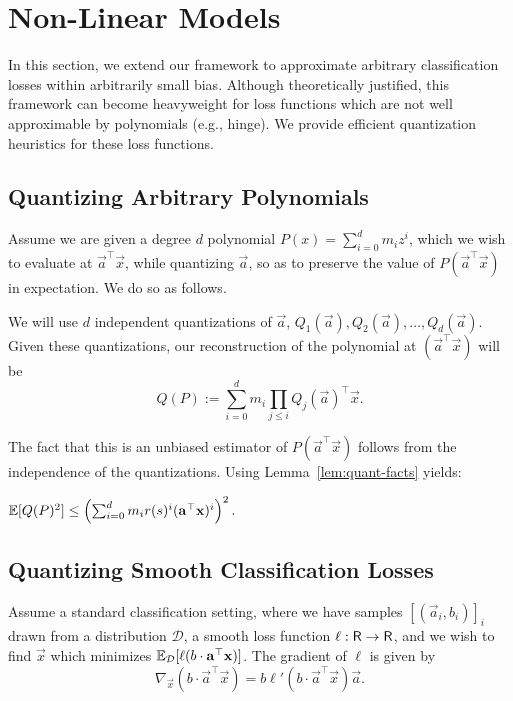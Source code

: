 \vspace{-0.5em}
\section{Non-Linear Models}

In this section, we extend our framework to approximate arbitrary classification losses within arbitrarily small bias. 
Although theoretically justified, this framework can become heavyweight for loss functions which are not well approximable by polynomials 
(e.g., hinge). We provide efficient quantization heuristics for these loss functions. 

\subsection{Quantizing Arbitrary Polynomials} 

Assume we are given a degree $d$ polynomial $P(x) = \sum_{i = 0}^{d} m_i z^i$, which
we wish to evaluate at $\vec{a}^\top \vec{x}$, while quantizing $\vec{a}$, so as to preserve the value of $P( \vec{a}^\top \vec{x})$ in expectation. 
We do so as follows. 

We will use $d$ independent quantizations of $\vec{a}$, $Q_1(\vec{a}), Q_2(\vec{a}), \ldots, Q_d(\vec{a})$. 
Given these quantizations, our reconstruction of the polynomial at $( \vec{a}^\top \vec{x})$ will be 
$$ Q(P) := \sum_{i = 0}^d m_i \prod_{j \leq i} Q_j(\vec{a})^\top \vec{x}.$$

The fact that this is an unbiased estimator of $P( \vec{a}^\top \vec{x} )$ follows from the independence of the quantizations. Using Lemma~\ref{lem:quant-facts} yields:

\begin{lemma}
\label{lem:poly-sec-moment-bound}
	$\mathbb{E}[ Q(P)^2 ] \leq \left(\sum_{i = 0}^d m_i r(s)^i (\mathbf{a}^\top \mathbf{x})^i\right)^2.$
\end{lemma} 




\vspace{-0.5em}
\subsection{Quantizing Smooth Classification Losses}
\vspace{-0.5em}

Assume a standard classification setting, where we have samples $[(\vec{a}_i, b_i)]_i$ drawn from a distribution $\mathcal{D}$, a smooth loss function $\ell: \mathsf{R} \rightarrow \mathsf{R}$, and we wish to find $\vec{x}$ which minimizes $\mathbb{E}_{\mathcal{D}} [ \ell( b \cdot \mathbf{a}^\top \mathbf{x}) ]$. The gradient of $\ell$ is given by 
$$ \nabla_\vec{x} (b \cdot \vec{a}^\top \vec{x}) = b \ell' (b \cdot \vec{a}^\top \vec{x}) \vec{a}.$$

